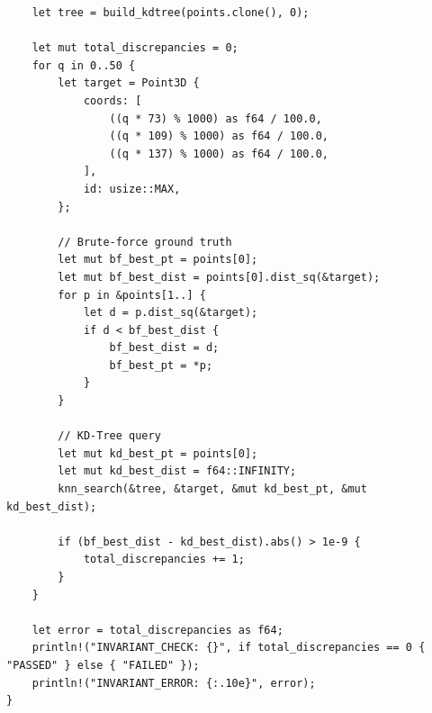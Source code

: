 \documentclass[11pt, a4paper]{article}
\begin{document}
\begin{verbatim}
    let tree = build_kdtree(points.clone(), 0);

    let mut total_discrepancies = 0;
    for q in 0..50 {
        let target = Point3D {
            coords: [
                ((q * 73) % 1000) as f64 / 100.0,
                ((q * 109) % 1000) as f64 / 100.0,
                ((q * 137) % 1000) as f64 / 100.0,
            ],
            id: usize::MAX,
        };

        // Brute-force ground truth
        let mut bf_best_pt = points[0];
        let mut bf_best_dist = points[0].dist_sq(&target);
        for p in &points[1..] {
            let d = p.dist_sq(&target);
            if d < bf_best_dist {
                bf_best_dist = d;
                bf_best_pt = *p;
            }
        }

        // KD-Tree query
        let mut kd_best_pt = points[0];
        let mut kd_best_dist = f64::INFINITY;
        knn_search(&tree, &target, &mut kd_best_pt, &mut kd_best_dist);

        if (bf_best_dist - kd_best_dist).abs() > 1e-9 {
            total_discrepancies += 1;
        }
    }

    let error = total_discrepancies as f64;
    println!("INVARIANT_CHECK: {}", if total_discrepancies == 0 { "PASSED" } else { "FAILED" });
    println!("INVARIANT_ERROR: {:.10e}", error);
}
\end{verbatim}
\end{document}
